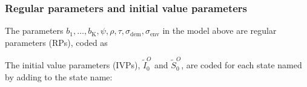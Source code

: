 \begin{frame}[fragile]
\frametitle{Regular parameters and initial value parameters}

\bi
\item
The parameters $b_1,\dots,b_\mathrm{K},\psi,\rho,\tau,\sigma_\mathrm{dem}, \sigma_\mathrm{env}$  in the model above are {regular parameters} (RPs), coded as
\ei
\begin{knitrout}\small
{}\color{fgcolor}\begin{kframe}
\begin{alltt}
 \hlkwb{<-} \hlstd{(}\hlstd{,}\hlstd{,}\hlstd{,}\hlstd{,}\hlstd{,}\hlstd{,}
  \hlstd{,}\hlstd{,}\hlstd{,}\hlstd{,}\hlstd{)}
\end{alltt}
\end{kframe}
\end{knitrout}

\bi
\item
The {initial value parameters} (IVPs), $\tilde I^O_{0}$ and  $\tilde S^O_{0}$, are coded for each state named by adding  to the state name:
\ei
\begin{knitrout}\small
{}\color{fgcolor}\begin{kframe}
\begin{alltt}
 \hlkwb{<-} \hlstd{(}\hlstd{,}\hlstd{)}
 \hlkwb{<-} 
\end{alltt}
\end{kframe}
\end{knitrout}

\end{frame}

